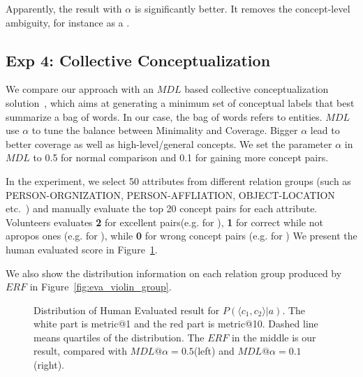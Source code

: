 %
%

Apparently, the result with $\alpha$ is significantly better. 
It removes the concept-level ambiguity, for instance  as a .


\subsection{Exp 4: Collective Conceptualization}
We compare our approach with an $MDL$ based collective conceptualization solution~\cite{sunconceptual}, which aims at generating a minimum set of conceptual labels that best summarize a bag of words.
In our case, the bag of words refers to entities.
$MDL$ use $\alpha$ to tune the balance between \ac{Minimality} and \ac{Coverage}. 
Bigger $\alpha$ lead to better coverage as well as high-level/general concepts.
We set the parameter $\alpha$ in $MDL$ to 0.5 for normal comparison and 0.1 for gaining more concept pairs.

In the experiment, we select 50 attributes from different relation groups (such as \ac{PERSON-ORGNIZATION, PERSON-AFFLIATION, OBJECT-LOCATION} etc.\ ) and manually evaluate the top 20 concept pairs for each attribute.
Volunteers evaluates \textbf{2} for excellent pairs(e.g.  for ), \textbf{1} for correct while not apropos ones (e.g.  for  ), while \textbf{0} for wrong concept pairs (e.g.  for  )
We present the human evaluated score in Figure~\ref{fig:eva_violin_pc1c2ga}.

We also show the distribution information on each relation group produced by $ERF$ in Figure~\ref{fig:eva_violin_group}.

\begin{figure}[!htb]
\centering
{}
\caption{Distribution of Human Evaluated result for $P(\langle c_1,c_2 \rangle|a)$. \small The white part is metric@1 and the red part is metric@10. Dashed line means quartiles of the distribution. The $ERF$ in the middle is our result, compared with $MDL@\alpha=0.5$(left) and $MDL@\alpha=0.1$(right). }
\label{fig:eva_violin_pc1c2ga}
\end{figure}

